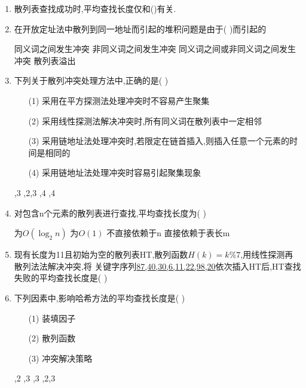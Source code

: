 \documentclass[12pt, a4paper, oneside, UTF8]{ctexbook}
\begin{document}
\begin{enumerate}
    \item 散列表查找成功时,平均查找长度仅和()有关. 

    \item 在开放定址法中散列到同一地址而引起的堆积问题是由于(   )而引起的
    \begin{choices}[2]
        \task 同义词之间发生冲突
        \task 非同义词之间发生冲突
        \task 同义词之间或非同义词之间发生冲突 
        \task 散列表溢出 
    \end{choices}



    \item 下列关于散列冲突处理方法中,正确的是(   ) 
    \begin{enumerate}
        \item [(1)] 采用在平方探测法处理冲突时不容易产生聚集
        \item [(2)] 采用线性探测法解决冲突时,所有同义词在散列表中一定相邻
        \item [(3)] 采用链地址法处理冲突时,若限定在链首插入,则插入任意一个元素的时间是相同的 
        \item [(4)] 采用链地址法处理冲突时容易引起聚集现象
    \end{enumerate}

    \begin{choices}
        ,3 ,2,3 ,4 ,4
    \end{choices}


    \item 对包含n个元素的散列表进行查找,平均查找长度为(   ) 
    \begin{choices}
        \task 为$O(\log_{2}{n})$
        \task 为$O(1)$
        \task 不直接依赖于n
        \task 直接依赖于表长m
    \end{choices}



    \item \bl 现有长度为11且初始为空的散列表HT,散列函数$H(k)=k\%7$,用线性探测再散列法法解决冲突,将
    关键字序列\underline{87,40,30,6,11,22,98,20}依次插入HT后,HT查找失败的平均查找长度是(   )
    \begin{choices}
    \end{choices}
    

    \item \bl 下列因素中,影响哈希方法的平均查找长度是(   ) 
    \begin{enumerate}
        \item [(1)] 装填因子
        \item [(2)] 散列函数
        \item [(3)] 冲突解决策略
    \end{enumerate}
    \begin{choices}
        ,2
        ,3
        ,3
        ,2,3
    \end{choices}




\end{enumerate}
\end{document}
